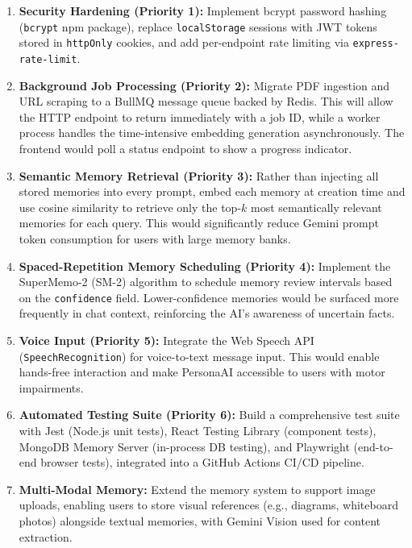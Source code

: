 \documentclass[12pt,a4paper]{report}
\begin{document}
\begin{enumerate}
  \item \textbf{Security Hardening (Priority 1):} Implement bcrypt password hashing (\texttt{bcrypt} npm package), replace \texttt{localStorage} sessions with JWT tokens stored in \texttt{httpOnly} cookies, and add per-endpoint rate limiting via \texttt{express-rate-limit}.

  \item \textbf{Background Job Processing (Priority 2):} Migrate PDF ingestion and URL scraping to a BullMQ message queue backed by Redis. This will allow the HTTP endpoint to return immediately with a job ID, while a worker process handles the time-intensive embedding generation asynchronously. The frontend would poll a status endpoint to show a progress indicator.

  \item \textbf{Semantic Memory Retrieval (Priority 3):} Rather than injecting all stored memories into every prompt, embed each memory at creation time and use cosine similarity to retrieve only the top-$k$ most semantically relevant memories for each query. This would significantly reduce Gemini prompt token consumption for users with large memory banks.

  \item \textbf{Spaced-Repetition Memory Scheduling (Priority 4):} Implement the SuperMemo-2 (SM-2) algorithm to schedule memory review intervals based on the \texttt{confidence} field. Lower-confidence memories would be surfaced more frequently in chat context, reinforcing the AI's awareness of uncertain facts.

  \item \textbf{Voice Input (Priority 5):} Integrate the Web Speech API (\texttt{SpeechRecognition}) for voice-to-text message input. This would enable hands-free interaction and make PersonaAI accessible to users with motor impairments.

  \item \textbf{Automated Testing Suite (Priority 6):} Build a comprehensive test suite with Jest (Node.js unit tests), React Testing Library (component tests), MongoDB Memory Server (in-process DB testing), and Playwright (end-to-end browser tests), integrated into a GitHub Actions CI/CD pipeline.

  \item \textbf{Multi-Modal Memory:} Extend the memory system to support image uploads, enabling users to store visual references (e.g., diagrams, whiteboard photos) alongside textual memories, with Gemini Vision used for content extraction.
\end{enumerate}
\end{document}
